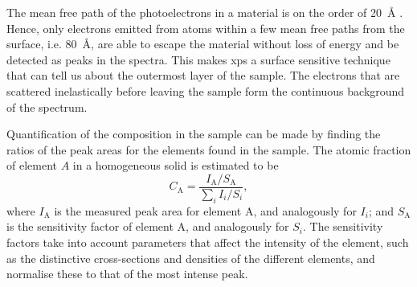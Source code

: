The mean free path of the photoelectrons in a material is on the order of \SI{20}{\angstrom} \citep{tanuma1991calculations}. Hence, only electrons emitted from atoms within a few mean free paths from the surface, i.e. \SI{80}{\angstrom}, are able to escape the material without loss of energy and be detected as peaks in the spectra. This makes \ac{xps} a surface sensitive technique that can tell us about the outermost layer of the sample. The electrons that are scattered inelastically before leaving the sample form the continuous background of the spectrum.

Quantification of the composition in the sample can be made by finding the ratios of the peak areas for the elements found in the sample. The atomic fraction of element $A$ in a homogeneous solid is estimated to be \citep{moulder2000handbook}
\begin{equation}\label{eq:xps_concentration}
    C_\mathrm{A} = \frac{I_\mathrm{A}/S_\mathrm{A}}{\sum_i I_i/S_i},
\end{equation}
where $I_\mathrm{A}$ is the measured peak area for element A, and analogously for $I_i$; and $S_\mathrm{A}$ is the sensitivity factor of element A, and analogously for $S_i$. The sensitivity factors take into account parameters that affect the intensity of the element, such as the distinctive cross-sections and densities of the different elements, and normalise these to that of the most intense peak. %

